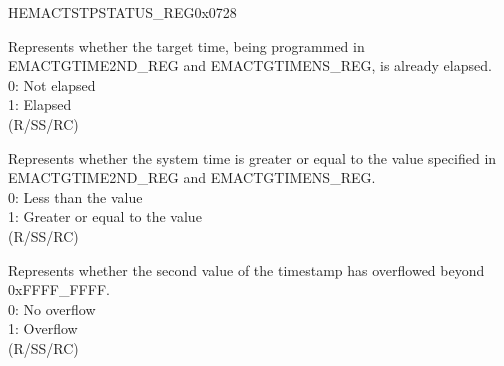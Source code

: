 \begin{register}{H}{EMACTSTPSTATUS\_REG}{0x0728}\label{regdesc:EMACTIMESTAMPSTATUSREG}
%
%
%
%
%
\regnewline%
\begin{regdesc}\begin{reglist}
\item [TSTRGTERR] Represents whether the target time, being programmed in EMACTGTIME2ND\_REG and EMACTGTIMENS\_REG, is already elapsed.\\
0: Not elapsed\\
1: Elapsed\\ (R/SS/RC)
\item [TSTARGT] Represents whether the system time is greater or equal to the value specified in EMACTGTIME2ND\_REG and EMACTGTIMENS\_REG.\\
0: Less than the value\\
1: Greater or equal to the value\\ (R/SS/RC)
\item [TSSOVF] Represents whether the second value of the timestamp has overflowed beyond 0xFFFF\_FFFF.\\
0: No overflow\\
1: Overflow\\ (R/SS/RC)
\end{reglist}\end{regdesc}
\end{register}
